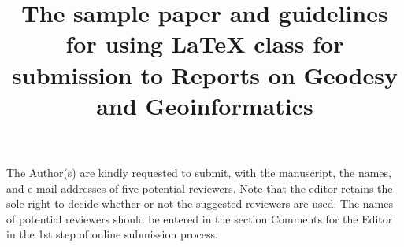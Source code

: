\documentclass{rog}
\title{The sample paper and guidelines for using \LaTeX{} class for submission to Reports on Geodesy and Geoinformatics}
\begin{document}
    \maketitle
    The Author(s) are kindly requested to submit, with the manuscript, the names, and e-mail addresses of five potential reviewers. Note that the editor retains the sole right to decide whether or not the suggested reviewers are used. The names of potential reviewers should be entered in the section Comments for the Editor in the 1st step of online submission process.
\cite{hw1997}
\end{document}
